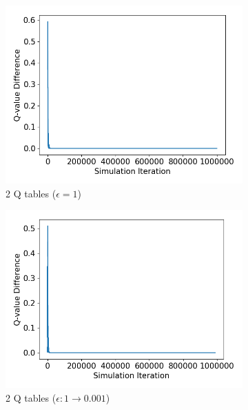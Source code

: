 \documentclass[10pt]{article}
\begin{document}
\begin{figure}[H]
  \centering
  \begin{subfigure}[b]{0.245\linewidth}
  \centering
  \includegraphics[width=\linewidth]{../figs/Qdifference_27_uncut.png}
      \caption{2 Q tables ($\epsilon=1$)}
  \label{fig:friendQ_2Q_1}
  \end{subfigure}
  \begin{subfigure}[b]{0.245\linewidth}
  \centering
  \includegraphics[width=\linewidth]{../figs/Qdifference_26_uncut.png}
      \caption{2 Q tables ($\epsilon:1\rightarrow0.001$)}
  \label{fig:friendQ_2Q_0001}
  \end{subfigure}
  \begin{subfigure}[b]{0.245\linewidth}

\end{subfigure}
\end{figure}
\end{document}
